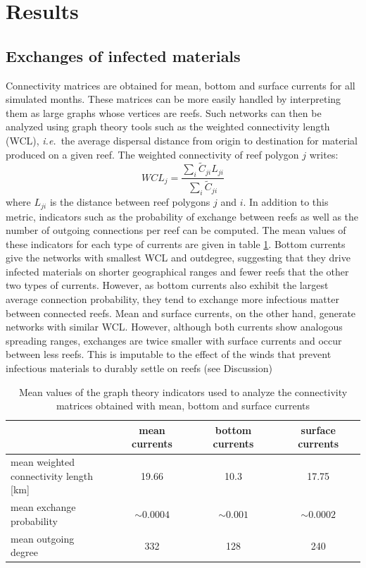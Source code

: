 \documentclass[utf8]{frontiersSCNS}
\newcommand{\ie}{{\it i.e.}\ }
\begin{document}
\section{Results}

\subsection{Exchanges of infected materials}
Connectivity matrices are obtained for mean, bottom and surface currents for all simulated months. These matrices can be more easily handled by interpreting them as large graphs whose vertices are reefs. Such networks can then be analyzed using graph theory tools such as the weighted connectivity length (WCL), \ie the average dispersal distance from origin to destination for material produced on a given reef. The weighted connectivity of reef polygon $j$ writes:
\begin{equation}
    WCL_j = \dfrac{\sum_i \tilde{C}_{ji} L_{ji}}{\sum_i \tilde{C}_{ji}}
\end{equation}
where $L_{ji}$ is the distance between reef polygons $j$ and $i$. In addition to this metric, indicators such as the probability of exchange between reefs as well as the number of outgoing connections per reef can be computed. The mean values of these indicators for each type of currents are given in table \ref{tab:connect}. Bottom currents give the networks with smallest WCL and outdegree, suggesting that they drive infected materials on shorter geographical ranges and fewer reefs that the other two types of currents. However, as bottom currents also exhibit the largest average connection probability, they tend to exchange more infectious matter between connected reefs. Mean and surface currents, on the other hand, generate networks with similar WCL. However, although both currents show analogous spreading ranges, exchanges are twice smaller with surface currents and occur between less reefs.  This is imputable to the effect of the winds that prevent infectious materials to durably settle on reefs (see Discussion)

\begin{table}
    \centering
    \begin{tabular}{|l|c|c|c|}
        \hline
        & mean currents & bottom currents & surface currents \\
        \hline
        \makecell{mean weighted \\connectivity length [km]} & 19.66 & 10.3 & 17.75 \\
        \hline
        \makecell{mean exchange \\probability} & $\sim 0.0004$ & $\sim 0.001$ & $\sim 0.0002$ \\
        \hline
        \makecell{mean outgoing \\degree} & 332 & 128 & 240 \\
        \hline
    \end{tabular}
    \caption{Mean values of the graph theory indicators used to analyze the connectivity matrices obtained with mean, bottom and surface currents}
    \label{tab:connect}
\end{table}
\end{document}

